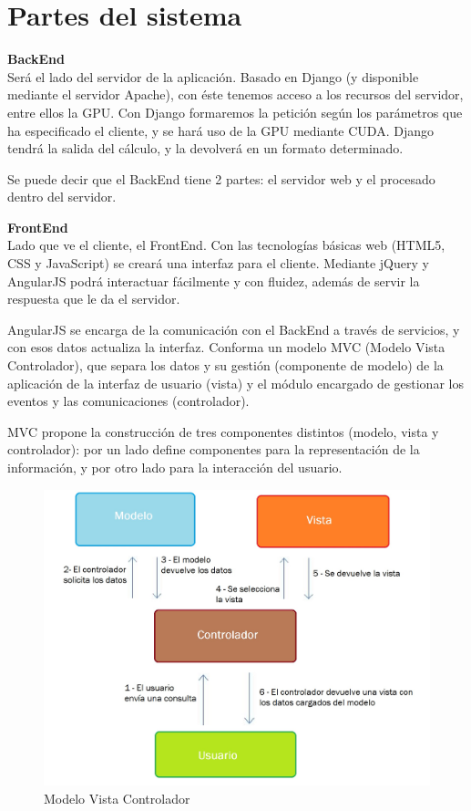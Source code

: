 \newpage
\section{Partes del sistema}

\bigskip
\textbf{BackEnd}\\

Será el lado del servidor de la aplicación. Basado en Django (y disponible mediante el servidor Apache), con éste tenemos acceso a los recursos del servidor, entre ellos la GPU. Con Django formaremos la petición según los parámetros que ha especificado el cliente, y se hará uso de la GPU mediante CUDA. Django tendrá la salida del cálculo, y la devolverá en un formato determinado.

Se puede decir que el BackEnd tiene 2 partes: el servidor web y el procesado dentro del servidor.

\bigskip
\textbf{FrontEnd}\\

Lado que ve el cliente, el FrontEnd. Con las tecnologías básicas web (HTML5, CSS y JavaScript) se creará una interfaz para el cliente. Mediante jQuery y AngularJS podrá interactuar fácilmente y con fluidez, además de servir la respuesta que le da el servidor.

\bigskip
AngularJS se encarga de la comunicación con el BackEnd a través de servicios, y con esos datos actualiza la interfaz. Conforma un modelo MVC (Modelo Vista Controlador), que separa los datos y su gestión (componente de modelo) de la aplicación de la interfaz de usuario (vista) y el módulo encargado de gestionar los eventos y las comunicaciones (controlador).

MVC propone la construcción de tres componentes distintos (modelo, vista y controlador): por un lado define componentes para la representación de la información, y por otro lado para la interacción del usuario. 

\bigskip
\begin{figure}[h]
	\centering
	\includegraphics[width=0.8\linewidth]{../images/mvc}
	\caption[Modelo Vista Controlador]{Modelo Vista Controlador}
	\label{fig:mvc}
\end{figure}



